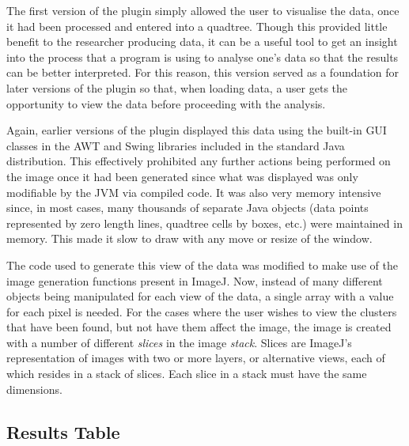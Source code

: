 The first version of the plugin simply allowed the user to visualise the data,
once it had been processed and entered into a quadtree. Though this provided
little benefit to the researcher producing data, it can be a useful tool to get
an insight into the process that a program is using to analyse one's data so
that the results can be better interpreted. For this reason, this version
served as a foundation for later versions of the plugin so that, when loading
data, a user gets the opportunity to view the data before proceeding with the
analysis.

Again, earlier versions of the plugin displayed this data using the built-in
GUI classes in the AWT\cite{zukowski1997java} and Swing\cite{loy2002java}
libraries included in the standard Java distribution. This effectively
prohibited any further actions being performed on the image once it had been
generated since what was displayed was only modifiable by the JVM via compiled
code. It was also very memory intensive since, in most cases, many thousands of
separate Java objects (data points represented by zero length lines, quadtree
cells by boxes, etc.) were maintained in memory. This made it slow to draw with
any move or resize of the window.

The code used to generate this view of the data was modified to make use of the
image generation functions present in ImageJ. Now, instead of many different
objects being manipulated for each view of the data, a single array with a
value for each pixel is needed. For the cases where the user wishes to view the
clusters that have been found, but not have them affect the image, the image is
created with a number of different \emph{slices} in the image \emph{stack}.
Slices are ImageJ's representation of images with two or more layers, or
alternative views, each of which resides in a stack of slices. Each slice in a
stack must have the same dimensions.



\subsection{Results Table}
\label{sub:results_table}

